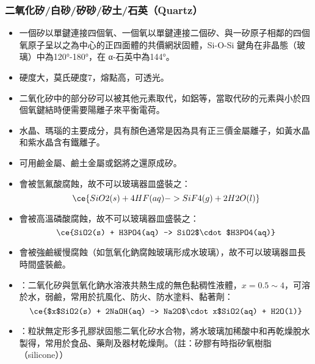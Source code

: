 \documentclass[a4paper,12pt]{report}
\begin{document}
\subsubsection{二氧化矽/白砂/矽砂/矽土/石英（Quartz）}
\begin{itemize}
\item 一個矽以單鍵連接四個氧、一個氧以單鍵連接二個矽、與一矽原子相鄰的四個氧原子呈以之為中心的正四面體的共價網狀固體，Si-O-Si 鍵角在非晶態（玻璃）中為120°-180°，在 α-石英中為144°。
\item 硬度大，莫氏硬度7，熔點高，可透光。
\item 二氧化矽中的部分矽可以被其他元素取代，如鋁等，當取代矽的元素與小於四個氧鍵結時便需要陽離子來平衡電荷。
\item 水晶、瑪瑙的主要成分，具有顏色通常是因為具有正三價金屬離子，如黃水晶和紫水晶含有鐵離子。
\item 可用鹼金屬、鹼土金屬或鋁將之還原成矽。
\item 會被氫氟酸腐蝕，故不可以玻璃器皿盛裝之：
\[\ce{SiO2(s) + 4HF(aq) -> SiF4(g) + 2H2O(l)}\]
\item 會被高溫磷酸腐蝕，故不可以玻璃器皿盛裝之：
\[\ce{SiO2(s) + H3PO4(aq) -> SiO2$\cdot$H3PO4(aq)}\]
\item 會被強鹼緩慢腐蝕（如氫氧化鈉腐蝕玻璃形成水玻璃），故不可以玻璃器皿長時間盛裝鹼。
\item {}：二氧化矽與氫氧化鈉水溶液共熱生成的無色黏稠性液體，$x=0.5\sim 4$，可溶於水，弱鹼，常用於抗風化、防火、防水塗料、黏著劑：
\[\ce{$x$SiO2(s) + 2NaOH(aq) -> Na2O$\cdot x$SiO2(aq) + H2O(l)}\]
\item {}：粒狀無定形多孔膠狀固態二氧化矽水合物，將水玻璃加稀酸中和再乾燥脫水製得，常用於食品、藥劑及器材乾燥劑。（註：矽膠有時指矽氧樹脂（silicone））
\end{itemize}
\end{document}
